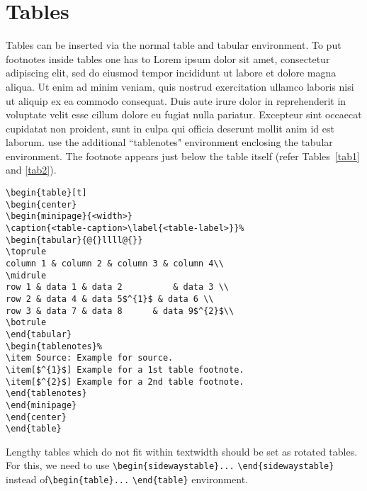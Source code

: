 \documentclass[unnumsec,webpdf,contemporary,large]{oup-authoring-template}%
\theoremstyle{thmstyleone}%
\theoremstyle{thmstyletwo}%
\theoremstyle{thmstylethree}%
\begin{document}
\section{Tables}\label{sec5}

Tables can be inserted via the normal table and tabular environment. To put
footnotes inside tables one has to Lorem ipsum dolor sit amet, consectetur adipiscing elit, sed do eiusmod tempor incididunt ut labore et dolore magna aliqua. Ut enim ad minim veniam, quis nostrud exercitation ullamco laboris nisi ut aliquip ex ea commodo consequat. Duis aute irure dolor in reprehenderit in voluptate velit esse cillum dolore eu fugiat nulla pariatur. Excepteur sint occaecat cupidatat non proident, sunt in culpa qui officia deserunt mollit anim id est laborum. use the additional ``tablenotes" environment
enclosing the tabular environment. The footnote appears just below the table
itself (refer Tables~\ref{tab1} and \ref{tab2}).


\begin{verbatim}
\begin{table}[t]
\begin{center}
\begin{minipage}{<width>}
\caption{<table-caption>\label{<table-label>}}%
\begin{tabular}{@{}llll@{}}
\toprule
column 1 & column 2 & column 3 & column 4\\
\midrule
row 1 & data 1 & data 2          & data 3 \\
row 2 & data 4 & data 5$^{1}$ & data 6 \\
row 3 & data 7 & data 8      & data 9$^{2}$\\
\botrule
\end{tabular}
\begin{tablenotes}%
\item Source: Example for source.
\item[$^{1}$] Example for a 1st table footnote.
\item[$^{2}$] Example for a 2nd table footnote.
\end{tablenotes}
\end{minipage}
\end{center}
\end{table}
\end{verbatim}


Lengthy tables which do not fit within textwidth should be set as rotated tables. For this, we need to use \verb+\begin{sidewaystable}...+ \verb+\end{sidewaystable}+ instead of\break \verb+\begin{table}...+ \verb+\end{table}+ environment.
\end{document}
